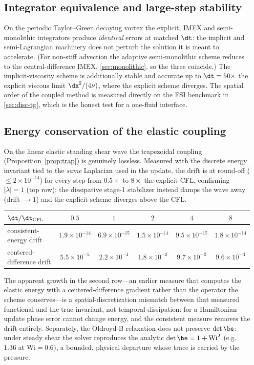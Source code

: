 \subsection{Integrator equivalence and large-step stability}
On the periodic Taylor--Green decaying vortex the explicit, IMEX and semi-monolithic
integrators produce \emph{identical} errors at matched $\dt$: the implicit and
semi-Lagrangian machinery does not perturb the solution it is meant to accelerate. (For
non-stiff advection the adaptive semi-monolithic scheme reduces to the central-difference
IMEX, \cref{sec:monolithic}, so the three coincide.) The implicit-viscosity scheme is
additionally stable and accurate up to $\dt=50\times$ the explicit viscous limit
$\dx^2/(4\nu)$, where the explicit scheme diverges. The spatial order of the coupled
method is measured directly on the FSI benchmark in \cref{sec:disc-tg}, which is the
honest test for a one-fluid interface.

\subsection{Energy conservation of the elastic coupling}
On the linear elastic standing shear wave the trapezoidal coupling
(Proposition~\ref{prop:trap}) is genuinely lossless. Measured with the discrete energy
invariant tied to the \emph{same} Laplacian used in the update, the drift is at round-off
($\le2\times10^{-14}$) for every step from $0.5\times$ to $8\times$ the explicit CFL,
confirming $|\lambda|=1$ (top row); the dissipative stage-1 stabilizer instead damps the
wave away (drift $\to1$) and the explicit scheme diverges above the CFL.
\begin{center}\small
\begin{tabular}{@{}lccccc@{}}
\toprule
$\dt/\dt_{\rm CFL}$ & $0.5$ & $1$ & $2$ & $4$ & $8$ \\
\midrule
consistent-energy drift & $1.9\!\times\!10^{-14}$ & $6.9\!\times\!10^{-15}$ &
$1.5\!\times\!10^{-14}$ & $9.5\!\times\!10^{-15}$ & $1.8\!\times\!10^{-14}$ \\
centered-difference drift & $5.5\!\times\!10^{-5}$ & $2.2\!\times\!10^{-4}$ &
$1.8\!\times\!10^{-3}$ & $9.7\!\times\!10^{-3}$ & $9.6\!\times\!10^{-3}$ \\
\bottomrule
\end{tabular}
\end{center}
The apparent growth in the second row---an earlier measure that computes the elastic
energy with a centered-difference gradient rather than the operator the scheme
conserves---is a spatial-discretization mismatch between that measured functional and the
true invariant, not temporal dissipation: for a Hamiltonian update phase error cannot
change energy, and the consistent measure removes the drift entirely.
Separately, the Oldroyd-B relaxation does not preserve $\det\be$: under steady shear the
solver reproduces the analytic $\det\be=1+\mathrm{Wi}^2$ (e.g.\ $1.36$ at
$\mathrm{Wi}=0.6$), a bounded, physical departure whose trace is carried by the pressure.
